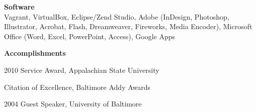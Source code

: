 \documentclass[letterpaper,10pt,final]{memoir}
\newcommand{\Sep}{\vspace{1.5em}}
\newcommand{\SmallSep}{\vspace{0.5em}}
\newcommand{\CVSection}[1]
	{\Large\textbf{#1}\par
	\SmallSep\normalsize\normalfont}
\newcommand{\CVItem}[1]
	{\textbf{\color{BrickRed} #1}}
\begin{document}
\CVItem{Software}\\
Vagrant, VirtualBox, Eclipse/Zend Studio, Adobe (InDesign, Photoshop, Illustrator, Acrobat, Flash, Dreamweaver, Fireworks, Media Encoder), Microsoft Office (Word, Excel, PowerPoint, Access), Google Apps
\Sep 

\CVSection{Accomplishments}
\begin{compactitem}[\color{BrickRed}$\circ$]
	\item 2010 Service Award, Appalachian State University
	\item Citation of Excellence, Baltimore Addy Awards
	\item 2004 Guest Speaker, University of Baltimore
\end{compactitem}

\end{document}
